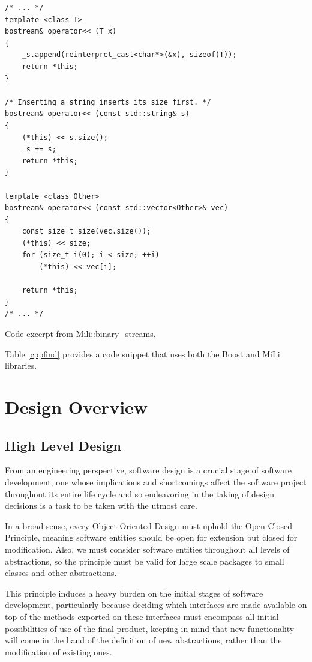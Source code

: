 \documentclass[a4paper,12pt,english]{report}
\begin{document}
\begin{table}[!htb]
\lstset{language=C++}
\begin{lstlisting}[frame=single]
/* ... */
template <class T>
bostream& operator<< (T x)
{
    _s.append(reinterpret_cast<char*>(&x), sizeof(T));
    return *this;
}

/* Inserting a string inserts its size first. */
bostream& operator<< (const std::string& s)
{
    (*this) << s.size();
    _s += s;
    return *this;
}

template <class Other>
bostream& operator<< (const std::vector<Other>& vec)
{
    const size_t size(vec.size());
    (*this) << size;
    for (size_t i(0); i < size; ++i)
        (*this) << vec[i];

    return *this;
}
/* ... */
\end{lstlisting}
\centering \caption{Code excerpt from Mili::binary\_streams.} 
\label{binstream}
\end{table}


Table \ref{cppfind} provides a code snippet that uses both the Boost and MiLi libraries. 

\chapter{Design Overview}

\section{High Level Design}

From an engineering perspective, software design is a crucial stage of software development, one whose implications and shortcomings affect the software project throughout its entire life cycle\cite{pressman} and so endeavoring in the taking of design decisions is a task to be taken with the utmost care.

In a broad sense, every Object Oriented Design must uphold the Open-Closed Principle, meaning software entities should be open for extension but closed for modification\cite{oosc}. Also, we must consider software entities throughout all levels of abstractions, so the principle must be valid for large scale packages to small classes and other abstractions.

This principle induces a heavy burden on the initial stages of software development, particularly because deciding which interfaces are made available on top of the methods exported on these interfaces must encompass all initial possibilities of use of the final product, keeping in mind that new functionality will come in the hand of the definition of new abstractions, rather than the modification of existing ones.
\end{document}
